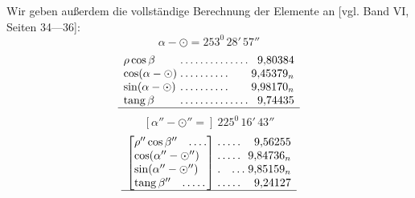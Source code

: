Wir geben außerdem die vollständige Berechnung der Elemente an [vgl. Band VI, Seiten 34—36]:
\[
\alpha-\odot=253^{0}\,28'\,57''
\]
\[
\begin{array}{l@{\;}l@{\;}r}
\rho\cos\beta&\mathord{.}\,\mathord{.}\,\mathord{.}\,\mathord{.}\,\mathord{.}\,\mathord{.}\,\mathord{.}\,\mathord{.}\,\mathord{.}\,\mathord{.}\,\mathord{.}\,\mathord{.}\,\mathord{.}\,\mathord{.}&9{,}80384\\
\cos(\alpha-\odot)&\mathord{.}\,\mathord{.}\,\mathord{.}\,\mathord{.}\,\mathord{.}\,\mathord{.}\,\mathord{.}\,\mathord{.}\,\mathord{.}\,\mathord{.}&9{,}45379_n\\
\sin(\alpha-\odot)&\mathord{.}\,\mathord{.}\,\mathord{.}\,\mathord{.}\,\mathord{.}\,\mathord{.}\,\mathord{.}\,\mathord{.}\,\mathord{.}\,\mathord{.}&9{,}98170_n\\
\operatorname{tang}\beta&\mathord{.}\,\mathord{.}\,\mathord{.}\,\mathord{.}\,\mathord{.}\,\mathord{.}\,\mathord{.}\,\mathord{.}\,\mathord{.}\,\mathord{.}\,\mathord{.}\,\mathord{.}\,\mathord{.}\,\mathord{.}&9{,}74435\\\hline
\end{array}
\]
\[
[\alpha''-\odot''=]\ 225^{0}\,16'\,43''
\]
\[
\begin{array}{l@{\;}l@{\;}r}
\left[\begin{array}{@{}l@{}}\rho''\cos\beta''\quad\mathord{.}\,\mathord{.}\,\mathord{.}\,\mathord{.}\\\cos(\alpha''-\odot'')\\\sin(\alpha''-\odot'')\\\operatorname{tang}\beta''\quad\mathord{.}\,\mathord{.}\,\mathord{.}\,\mathord{.}\,\mathord{.}\end{array}\right]&
\begin{array}{@{}l@{}}\mathord{.}\,\mathord{.}\,\mathord{.}\,\mathord{.}\,\mathord{.}\\\mathord{.}\,\mathord{.}\,\mathord{.}\,\mathord{.}\,\mathord{.}\\\mathord{.}\quad\mathord{.}\,\mathord{.}\,\mathord{.}\\\mathord{.}\,\mathord{.}\,\mathord{.}\,\mathord{.}\,\mathord{.}\end{array}&
\begin{array}{@{}r@{}}9{,}56255\\9{,}84736_n\\9{,}85159_n\\9{,}24127\end{array}\\\hline
\end{array}
\]
